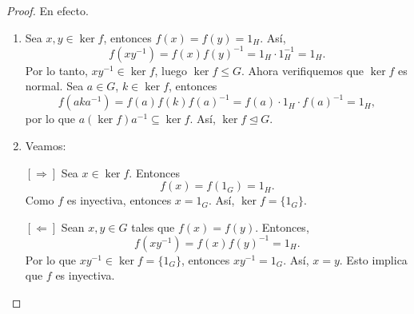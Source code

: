 \begin{proof}
	En efecto.
	\begin{enumerate}
		\item Sea \(x,y \in \ker f\), entonces \(f(x) = f(y) = 1_H\). Así,
		\[
		f(x y^{-1}) = f(x) f(y)^{-1} = 1_H \cdot 1_H^{-1} = 1_H.
		\]
		Por lo tanto, \(x y^{-1} \in \ker f\), luego \(\ker f \leq G\). Ahora verifiquemos que \(\ker f\) es normal. Sea \(a \in G\), \(k \in \ker f\), entonces
		\[
		f(a k a^{-1}) = f(a) f(k) f(a)^{-1} = f(a) \cdot 1_H \cdot f(a)^{-1} = 1_H,
		\]
		por lo que \(a (\ker f) a^{-1} \subseteq \ker f\). Así, \(\ker f \trianglelefteq G\).
		
		\item Veamos:
		
		\noindent \([ \Rightarrow ]\) Sea \(x \in \ker f\). Entonces
		\[
		f(x) = f(1_G) = 1_H.
		\]
		Como \(f\) es inyectiva, entonces \(x = 1_G\). Así, \(\ker f = \{1_G\}\).
		
		\noindent \([ \Leftarrow ]\) Sean \(x,y \in G\) tales que \(f(x) = f(y)\). Entonces,
		\[
		f(x y^{-1}) = f(x) f(y)^{-1} = 1_H.
		\]
		Por lo que \(x y^{-1} \in \ker f = \{1_G\}\), entonces \(x y^{-1} = 1_G\). Así, \(x = y\). Esto implica que \(f\) es inyectiva.
	\end{enumerate}
\end{proof}



\begin{teorema}\label{Propiedad universal del cociente}
\end{teorema}

